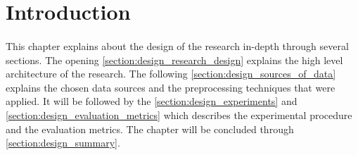 \section{Introduction}

\paragraph{}
This chapter explains about the design of the research in-depth through several sections. The opening \autoref{section:design_research_design} explains the high level architecture of the research. The following \autoref{section:design_sources_of_data} explains the chosen data sources and the preprocessing techniques that were applied. It will be followed by the \autoref{section:design_experiments} and \autoref{section:design_evaluation_metrics} which describes the experimental procedure and the evaluation metrics. The chapter will be concluded through \autoref{section:design_summary}.
